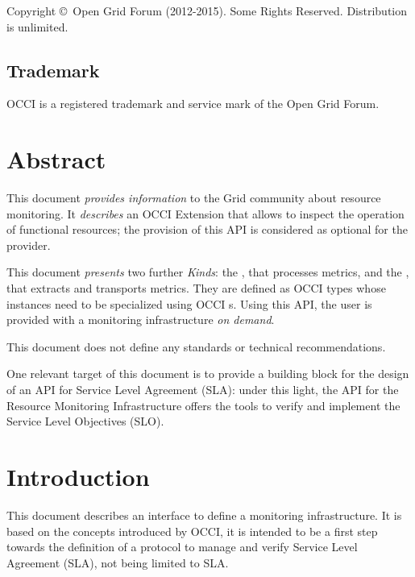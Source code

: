 \documentclass[12pt]{article}  %
\newcommand{\copyrightyears}{2012-2015}  %
\begin{document}
Copyright \copyright \ Open Grid Forum (\copyrightyears).  Some Rights Reserved.  
Distribution is unlimited.

\subsection*{Trademark}

OCCI is a registered trademark and service mark of the Open Grid Forum. 

\section*{Abstract}

This document {\em provides information} to the Grid community about resource monitoring. It {\em describes} an OCCI Extension that allows to inspect the operation of functional resources; the provision of this API is considered as optional for the provider.

This document {\em presents} two further {\em Kinds}: the \sens, that processes metrics, and the \coll, that extracts and transports metrics. They are defined as OCCI types whose instances need to be specialized using OCCI \mi s. Using this API, the user is provided with a monitoring infrastructure {\em on demand}.

This document does not define any standards or technical recommendations.

One relevant target of this document is to provide a building block for the design of an API for Service Level Agreement (SLA): under this light, the API for the Resource Monitoring Infrastructure offers the tools to verify and implement the Service Level Objectives (SLO).

\tableofcontents

\newpage

\section{Introduction}

This document describes an interface to define a monitoring infrastructure. It is based on the concepts introduced by OCCI, it is intended to be a first step towards the definition of a protocol to manage and verify Service Level Agreement (SLA), not being limited to SLA.
\end{document}
